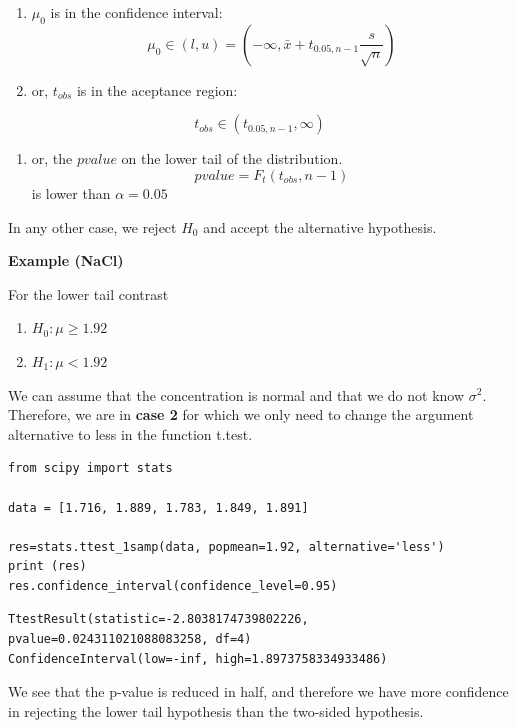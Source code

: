 \documentclass[
]{book}
\providecommand{\tightlist}{%
  \setlength{\itemsep}{0pt}\setlength{\parskip}{0pt}}
\begin{document}
\begin{enumerate}
\def\labelenumi{\arabic{enumi}.}
\item
  \(\mu_0\) is in the confidence interval:
  \[\mu_0\in (l,u)=(-\infty, \bar{x}+t_{0.05,n-1} \frac{s}{\sqrt{n}})\]
\item
  or, \(t_{obs}\) is in the aceptance region:
\end{enumerate}

\[t_{obs}\in (t_{0.05,n-1}, \infty)\]

\begin{enumerate}
\def\labelenumi{\arabic{enumi}.}
\setcounter{enumi}{2}
\tightlist
\item
  or, the \(pvalue\) on the lower tail of the distribution.\\
  \[pvalue=F_t(t_{obs},n-1)\]
  is lower than \(\alpha=0.05\)
\end{enumerate}

In any other case, we reject \(H_0\) and accept the alternative hypothesis.

\textbf{Example (NaCl)}

For the lower tail contrast

\begin{enumerate}
\def\labelenumi{\alph{enumi}.}
\tightlist
\item
  \(H_0:\mu \geq 1.92\)
\item
  \(H_1:\mu < 1.92\)
\end{enumerate}

We can assume that the concentration is normal and that we do not know \(\sigma^2\). Therefore, we are in \textbf{case 2} for which we only need to change the argument alternative to less in the function t.test.

\begin{verbatim}
from scipy import stats

data = [1.716, 1.889, 1.783, 1.849, 1.891]

res=stats.ttest_1samp(data, popmean=1.92, alternative='less')
print (res)
res.confidence_interval(confidence_level=0.95)
\end{verbatim}

\begin{verbatim}
TtestResult(statistic=-2.8038174739802226, pvalue=0.024311021088083258, df=4)
ConfidenceInterval(low=-inf, high=1.8973758334933486)
\end{verbatim}

We see that the p-value is reduced in half, and therefore we have more confidence in rejecting the lower tail hypothesis than the two-sided hypothesis.
\end{document}
